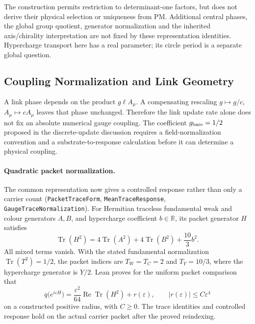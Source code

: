 The construction permits restriction to determinant-one factors, but does not derive their physical selection or uniqueness from PM. Additional central phases, the global group quotient, generator normalization and the inherited axis/chirality interpretation are not fixed by these representation identities. Hypercharge transport here has a real parameter; its circle period is a separate global question.

\subsection{Coupling Normalization and Link Geometry}

A link phase depends on the product $g\ell A_\mu$. A compensating rescaling $g\mapsto g/c$, $A_\mu\mapsto cA_\mu$ leaves that phase unchanged. Therefore the link update rate alone does not fix an absolute numerical gauge coupling. The coefficient $g_{\rm bare}=1/2$ proposed in the discrete-update discussion requires a field-normalization convention and a substrate-to-response calculation before it can determine a physical coupling.

\paragraph{Quadratic packet normalization.} The common representation now gives a controlled response rather than only a carrier count (\texttt{PacketTraceForm}, \texttt{MeanTraceResponse}, \texttt{GaugeTraceNormalization}). For Hermitian traceless fundamental weak and colour generators $A,B$, and hypercharge coefficient $b\in\mathbb R$, its packet generator $H$ satisfies
\begin{equation}
 \operatorname{Tr}(H^2)=4\operatorname{Tr}(A^2)+4\operatorname{Tr}(B^2)+\frac{10}{3}b^2.
\end{equation}
All mixed terms vanish. With the stated fundamental normalization $\operatorname{Tr}(T^2)=1/2$, the packet indices are $T_W=T_C=2$ and $T_Y=10/3$, where the hypercharge generator is $Y/2$. Lean proves for the uniform packet comparison that
\begin{equation}
 \overline q\bigl(e^{i\varepsilon H}\bigr)
 =\frac{\varepsilon^2}{64}\operatorname{Re}\operatorname{Tr}(H^2)+r(\varepsilon),
 \qquad |r(\varepsilon)|\le C\varepsilon^4
\end{equation}
on a constructed positive radius, with $C\ge0$. The trace identities and controlled response hold on the actual carrier packet after the proved reindexing.

